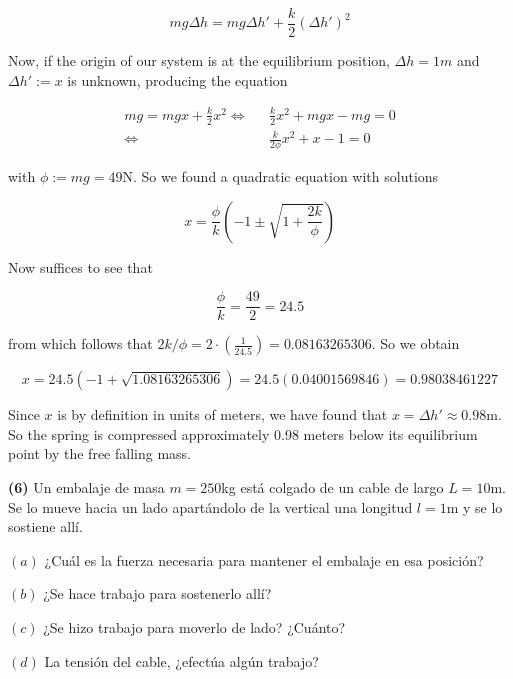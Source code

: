 \documentclass[12pt]{article}
\theoremstyle{definition}
\begin{document}
\begin{equation*}
    mg \Delta h = mg \Delta h' + \frac{k}{2}(\Delta h')^2
\end{equation*}

Now, if the origin of our system is at the equilibrium position, $\Delta h =
\text{1}m$ and $\Delta h' := x$ is unknown, producing the equation 

\begin{align*}
    mg = mgx + \frac{k}{2}x^2 
    \iff~ ~ ~ 
    &\frac{k}{2}x^2 + mgx - mg = 0 \\ 
    \iff ~ ~ ~  
    &\frac{k}{2\phi}x^2 + x - 1 = 0
\end{align*}

with $\phi := mg = 49\text{N}$. So we found a quadratic equation with solutions

\begin{equation*}
    x = \frac{\phi}{k} \left( -1 \pm \sqrt{1 + \frac{2k}{\phi}}  \right) 
\end{equation*}

Now suffices to see that 

\begin{equation*}
    \frac{\phi}{k} = \frac{ 49 }{2} = 24.5 
\end{equation*}

from which follows that $2k / \phi = 2 \cdot \left(\frac{1}{24.5}
\right) = 0.08163265306$. So we obtain 

\begin{equation*}
    x = 24.5 \left( -1 + \sqrt{1.08163265306}  \right) = 24.5 \left(
    0.04001569846 \right) = 0.98038461227
\end{equation*}

Since $x$ is by definition in units of meters, we have found that  
$x = \Delta h' \approx 0.98\text{m} $. So the spring is compressed approximately
0.98 meters below its equilibrium point by the free falling mass.

\pagebreak 

\begin{shaded}
    \textbf{(6)} Un embalaje de masa $m = 250$kg está colgado de un cable de
    largo $L = 10$m. Se lo mueve hacia un lado apartándolo de la vertical una
    longitud $l = 1$m y se lo sostiene allí.

    $(a)$ ¿Cuál es la fuerza necesaria para mantener el embalaje en esa
    posición? 

    $(b)$ ¿Se hace trabajo para sostenerlo allí? 

    $(c)$ ¿Se hizo trabajo para moverlo de lado? ¿Cuánto? 

    $(d)$ La tensión del cable, ¿efectúa algún trabajo?
\end{shaded}
\end{document}
